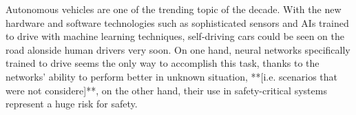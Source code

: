 \newpage

Autonomous vehicles are one of the trending topic of the decade. With the new hardware and software technologies such as sophisticated sensors and AIs trained to drive with machine learning techniques, self-driving cars could be seen on the road alonside human drivers very soon.\newline
On one hand, neural networks specifically trained to drive seems the only way to accomplish this task, thanks to the networks' ability to perform better in unknown situation, **[i.e. scenarios that were not considere]**, on the other hand, their use in safety-critical systems represent a huge risk for safety.\newline
